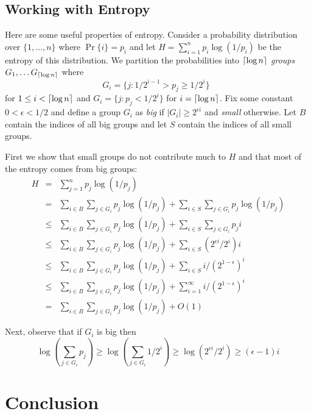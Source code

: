 \documentclass[charterfonts,lotsofwhite]{patmorin}
\begin{document}
\subsection{Working with Entropy}

Here are some useful properties of entropy. Consider a probability
distribution over $\{1,\ldots,n\}$ where $\Pr\{i\}=p_i$ and let
$H=\sum_{i=1}^n p_i\log (1/p_i)$ be the entropy of this distribution.
We partition the probabilities into $\left\lceil \log n \right\rceil$ \emph{groups}
$G_1,\ldots G_{\left\lceil \log n \right\rceil}$ where 
\[
	G_i = \{j : 1/2^{i-1} > p_j \ge 1/2^i \} \enspace 
\]
for $1\le i < \left\lceil \log n \right\rceil$ and $G_{i}=\{j: p_j < 1/2^i\}$ for
$i=\left\lceil \log n \right\rceil$.  Fix some constant $0<\epsilon < 1/2$ and define a
group $G_i$ as \emph{big} if $|G_i|\ge 2^{\epsilon i}$ and
\emph{small} otherwise.  Let $B$ contain the indices of all big groups
and let $S$ contain the indices of all small groups.

First we show that small groups do not contribute much to $H$ and that
most of the entropy comes from big groups:
\begin{eqnarray*}
   H & = & \sum_{j=1}^n p_j\log(1/p_j) \\
   & = & \sum_{i\in B}\sum_{j\in G_i} p_j\log (1/p_j) +
   	\sum_{i\in S}\sum_{j\in G_i} p_j\log (1/p_j) \\
    & \le & \sum_{i\in B}\sum_{j\in G_i} p_j\log (1/p_j) +
	\sum_{i\in S}\sum_{j\in G_i} p_j i \\
    & \le & \sum_{i\in B}\sum_{j\in G_i} p_j\log (1/p_j) +
	\sum_{i\in S}(2^{\epsilon i}/2^i) i \\
    & \le & \sum_{i\in B}\sum_{j\in G_i} p_j\log (1/p_j) +
	\sum_{i\in S}i/(2^{1-\epsilon})^i \\
    & \le & \sum_{i\in B}\sum_{j\in G_i} p_j\log (1/p_j) +
	\sum_{i=1}^\infty i/(2^{1-\epsilon})^i \\
    & = & \sum_{i\in B}\sum_{j\in G_i} p_j\log (1/p_j) + O(1)
\end{eqnarray*}

Next, observe that if $G_i$ is big then
\begin{equation}
    \log\left(\sum_{j\in G_i} p_j \right)  
     \ge \log\left(\sum_{j\in G_i} 1/2^{i} \right)  
      \ge \log\left(2^{\epsilon i}/2^{i} \right)  
	\ge (\epsilon -1)i 
\end{equation}


\begin{lem}
\end{lem}

\section{Conclusion}
\end{document}
